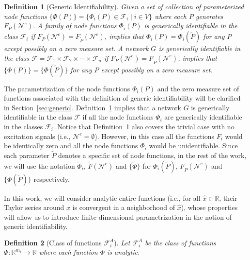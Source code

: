 \documentclass[letterpaper,10pt,journal]{IEEEtran}
\newcommand{\F}{\mathcal{F}}
\newcommand{\Fone}{\mathcal{F}^A}
\newtheorem{definition}{Definition}
\newcommand{\R}{\mathbb R}
\newcommand{\NN}{\mathcal{N}}
\begin{document}
\begin{definition}[Generic Identifiability]\label{def:math_identifiability}
    Given a set of collection of parameterized node functions $\{ \Phi(P) \}=\{\Phi_i(P)\in \F_i\;|\;i\in V\}$ where each $P$ generates $F_P(\NN^e)$. A family of node functions $\Phi_i(P)$ is generically identifiable in the class $\F_i$ if $F_P(\NN^e)=F_{\tilde P} (\NN^e)$, implies that $\Phi_i(P)=\Phi_i(\tilde P)$ for any $P$ except possibly on a zero measure set. A network $G$ is generically identifiable in the class $\F=\F_1\times\F_2\times\cdots\times \F_n$ if $F_P(\NN^e)=F_{\tilde P} (\NN^e)$, implies that $\{\Phi(P) \}=\{ \Phi(\tilde P) \}$ for any $P$ except possibly on a zero measure set.
\end{definition}
The parametrization of the node functions  $\Phi_i(P)$ and the zero measure set of functions associated with the definition of generic identifiability will be clarified in Section~\ref{sec:generic}. Definition~\ref{def:math_identifiability} implies that a network $G$ is generically identifiable in the class $\F$ if all the node functions $\Phi_i$ are generically identifiable in the classes $\F_i$. Notice that Definition~\ref{def:math_identifiability} also covers the trivial case with no excitation signals (i.e., $\NN^e=\emptyset$). However, in this case all the functions $F_i$ would be identically zero and all the node functions $\Phi_i$ would be unidentifiable. Since each parameter $\tilde P$ denotes a specific set of node functions, in the rest of the work, we will use the notation $\tilde \Phi_i$, $\tilde F(\NN^e)$ and $\{ \tilde \Phi \}$ for $\Phi_i(\tilde P)$, $F_{\tilde P}(\NN^e)$ and $\{ \Phi(\tilde P) \}$ respectively.

 
In this work, we will consider analytic entire functions (i.e., for all $\hat x\in\R$, their Taylor series around $\hat x$ is convergent in a neighborhood of $\hat x$), whose properties will allow us to introduce finite-dimensional parametrization in the notion of generic identifiability. 




\begin{definition}[Class of functions $\Fone_i$]\label{def:class_Ftwo}
Let $\Fone_i$ be the class of  functions $\Phi:\R^{m_i}\to\R$ where each function $\Phi$ is analytic.
\end{definition}
\end{document}

